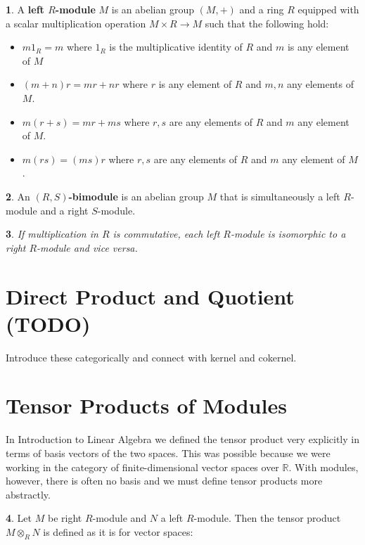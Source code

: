 \documentclass[oneside,english]{amsbook}
\numberwithin{section}{chapter}
\theoremstyle{plain}
\newtheorem{thm}{\protect\theoremname}
\theoremstyle{definition}
\newtheorem{defn}[thm]{\protect\definitionname}
\providecommand{\definitionname}{Definition}
\providecommand{\theoremname}{Theorem}
\begin{document}
		\begin{defn}
			A \textbf{left $R$-module} $M$ is an abelian group $(M, +)$ and a ring $R$ equipped with a scalar multiplication operation $M\times R\to M$ such that the following hold:
			\begin{itemize}
				\item $m1_R = m$ where $1_R$ is the multiplicative identity of $R$ and $m$ is any element of $M$
				\item $(m + n)r = mr + nr$ where $r$ is any element of $R$ and $m, n$ any elements of $M$.
				\item $m(r + s) = mr + ms$ where $r, s$ are any elements of $R$ and $m$ any element of $M$.
				\item $m(rs) = (ms)r$ where $r, s$ are any elements of $R$ and $m$ any element of $M$.
			\end{itemize}
		\end{defn}
		
		\begin{defn}
			An \textbf{$(R, S)$-bimodule} is an abelian group $M$ that is simultaneously a left $R$-module and a right $S$-module.
		\end{defn}
		
		\begin{thm}
			If multiplication in $R$ is commutative, each left $R$-module is isomorphic to a right $R$-module and \textit{vice versa}.
		\end{thm}
		
	\section{Direct Product and Quotient (TODO)}
	
		Introduce these categorically and connect with kernel and cokernel.
	
	\section{Tensor Products of Modules}

		In Introduction to Linear Algebra we defined the tensor product very explicitly in terms of basis vectors of the two spaces. This was possible because we were working in the category of finite-dimensional vector spaces over $\mathbb{R}$. With modules, however, there is often no basis and we must define tensor products more abstractly.
		
		\begin{defn}
			Let $M$ be right $R$-module and $N$ a left $R$-module. Then the tensor product $M\otimes_R N$ is defined as it is for vector spaces:
		\end{defn}
\end{document}
